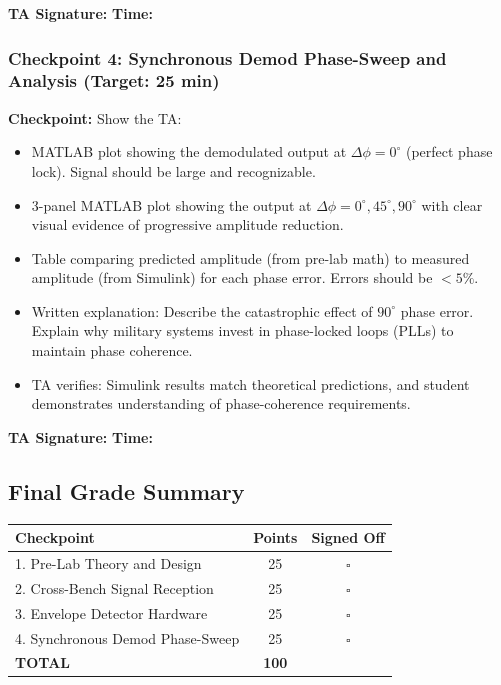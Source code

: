 \documentclass[11pt,letterpaper]{article}
\providecommand{\cpECE}[1]{\textcolor{OliveGreen}{\textbf{Checkpoint:} #1}}
\begin{document}
\vspace{0.3cm}
\textbf{TA Signature:} \underline{\hspace{2.5cm}} \quad \textbf{Time:} \underline{\hspace{1.5cm}}

\vspace{0.5cm}

\subsubsection*{Checkpoint 4: Synchronous Demod Phase-Sweep and Analysis (Target: 25 min)}

\cpECE{Show the TA:}
\begin{itemize}
    \item[$\square$] MATLAB plot showing the demodulated output at $\Delta \phi = 0^\circ$ (perfect phase lock). Signal should be large and recognizable.
    \item[$\square$] 3-panel MATLAB plot showing the output at $\Delta \phi = 0^\circ, 45^\circ, 90^\circ$ with clear visual evidence of progressive amplitude reduction.
    \item[$\square$] Table comparing predicted amplitude (from pre-lab math) to measured amplitude (from Simulink) for each phase error. Errors should be $< 5\%$.
    \item[$\square$] Written explanation: Describe the catastrophic effect of $90^\circ$ phase error. Explain why military systems invest in phase-locked loops (PLLs) to maintain phase coherence.
    \item[$\square$] TA verifies: Simulink results match theoretical predictions, and student demonstrates understanding of phase-coherence requirements.
\end{itemize}

\vspace{0.3cm}
\textbf{TA Signature:} \underline{\hspace{2.5cm}} \quad \textbf{Time:} \underline{\hspace{1.5cm}}

\vspace{1cm}

\subsection*{Final Grade Summary}

\begin{center}
\begin{tabular}{|l|c|c|}
\hline
\textbf{Checkpoint} & \textbf{Points} & \textbf{Signed Off} \\
\hline
1. Pre-Lab Theory and Design & 25 & $\square$ \\
2. Cross-Bench Signal Reception & 25 & $\square$ \\
3. Envelope Detector Hardware & 25 & $\square$ \\
4. Synchronous Demod Phase-Sweep & 25 & $\square$ \\
\hline
\textbf{TOTAL} & \textbf{100} & \\
\hline
\end{tabular}
\end{center}
\end{document}
